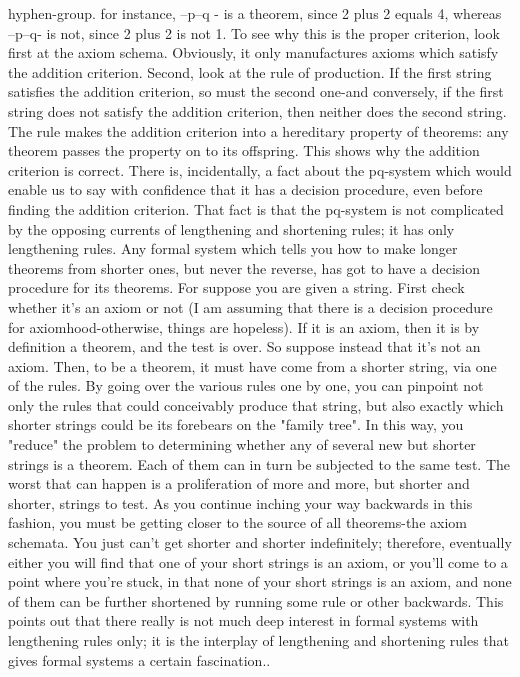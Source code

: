 hyphen-group. for instance, --p--q - is a theorem, since 2 plus 2 equals 4, whereas --p--q- is not, since 2 plus 2 is not 1. To see why this is the proper criterion, look first at the axiom schema. Obviously, it only manufactures axioms which satisfy the addition criterion. Second, look at the rule of production. If the first string satisfies the addition criterion, so must the second one-and conversely, if the first string does not satisfy the addition criterion, then neither does the second string. The rule makes the addition criterion into a hereditary property of theorems: any theorem passes the property on to its offspring. This shows why the addition criterion is correct. There is, incidentally, a fact about the pq-system which would enable us to say with confidence that it has a decision procedure, even before finding the addition criterion. That fact is that the pq-system is not complicated by the opposing currents of lengthening and shortening rules; it has only lengthening rules. Any formal system which tells you how to make longer theorems from shorter ones, but never the reverse, has got to have a decision procedure for its theorems. For suppose you are given a string. First check whether it's an axiom or not (I am assuming that there is a decision procedure for axiomhood-otherwise, things are hopeless). If it is an axiom, then it is by definition a theorem, and the test is over. So suppose instead that it's not an axiom. Then, to be a theorem, it must have come from a shorter string, via one of the rules. By going over the various rules one by one, you can pinpoint not only the rules that could conceivably produce that string, but also exactly which shorter strings could be its forebears on the "family tree". In this way, you "reduce" the problem to determining whether any of several new but shorter strings is a theorem. Each of them can in turn be subjected to the same test. The worst that can happen is a proliferation of more and more, but shorter and shorter, strings to test. As you continue inching your way backwards in this fashion, you must be getting closer to the source of all theorems-the axiom schemata. You just can't get shorter and shorter indefinitely; therefore, eventually either you will find that one of your short strings is an axiom, or you'll come to a point where you're stuck, in that none of your short strings is an axiom, and none of them can be further shortened by running some rule or other backwards. This points out that there really is not much deep interest in formal systems with lengthening rules only; it is the interplay of lengthening and shortening rules that gives formal systems a certain fascination.. 

